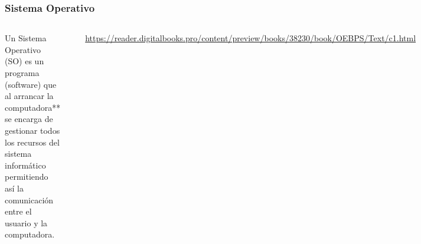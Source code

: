 \begin{frame}
\frametitle{Sistema Operativo}  
\begin{columns}
\begin{block}{}
Un Sistema Operativo (SO) es un programa (software) que al arrancar la computadora** se encarga de gestionar todos los recursos del sistema informático permitiendo así la comunicación entre el usuario y la computadora. 
\end{block}
\begin{center}
\includegraphics[width=0.95\linewidth]{00_IntroProgramacionYMoviles/SistemaOperativo1.png} 
\end{center}
\tiny{\url{https://reader.digitalbooks.pro/content/preview/books/38230/book/OEBPS/Text/c1.html}}

\begin{center}
\includegraphics[width=0.95\linewidth]{00_IntroProgramacionYMoviles/SistemaOperativo2.png} 
\end{center}
\end{columns}

\end{frame}


